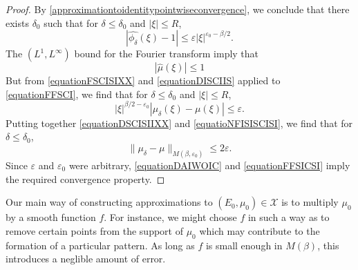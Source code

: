 \documentclass[12pt,reqno]{article}
\numberwithin{equation}{section}
\begin{document}
\begin{proof}
    By \eqref{approximationtoidentitypointwiseconvergence}, we conclude that there exists $\delta_0$ such that for $\delta \leq \delta_0$ and $|\xi| \leq R$,
    \begin{equation} \label{equationDISCIIS}
        |\widehat{\phi_\delta}(\xi) - 1| \leq \varepsilon |\xi|^{\varepsilon_0 - \beta/2}.
    \end{equation}
    The $(L^1,L^\infty)$ bound for the Fourier transform imply that
    \begin{equation} \label{equationFSCISIXX}
        |\widehat{\mu}(\xi)| \leq 1
    \end{equation}
    But from \eqref{equationFSCISIXX} and \eqref{equationDISCIIS} applied to \eqref{equationFFSCI}, we find that for $\delta \leq \delta_0$ and $|\xi| \leq R$,
    \begin{equation} \label{equatioNFISISCISI}
        |\xi|^{\beta/2 - \varepsilon_0} |\mu_\delta(\xi) - \mu(\xi)| \leq \varepsilon.
    \end{equation}
    Putting together \eqref{equationDSCISIIXX} and \eqref{equatioNFISISCISI}, we find that for $\delta \leq \delta_0$,
    \begin{equation} \label{equationDAIWOIC}
        \| \mu_\delta - \mu \|_{M(\beta,\varepsilon_0)} \leq 2\varepsilon.
    \end{equation}
    Since $\varepsilon$ and $\varepsilon_0$ were arbitrary, \eqref{equationDAIWOIC} and \eqref{equationFFSICSI} imply the required convergence property.
\end{proof}

Our main way of constructing approximations to $(E_0,\mu_0) \in \mathcal{X}$ is to multiply $\mu_0$ by a smooth function $f$. For instance, we might choose $f$ in such a way as to remove certain points from the support of $\mu_0$ which may contribute to the formation of a particular pattern. As long as $f$ is small enough in $M(\beta)$, this introduces a neglible amount of error.
\end{document}
